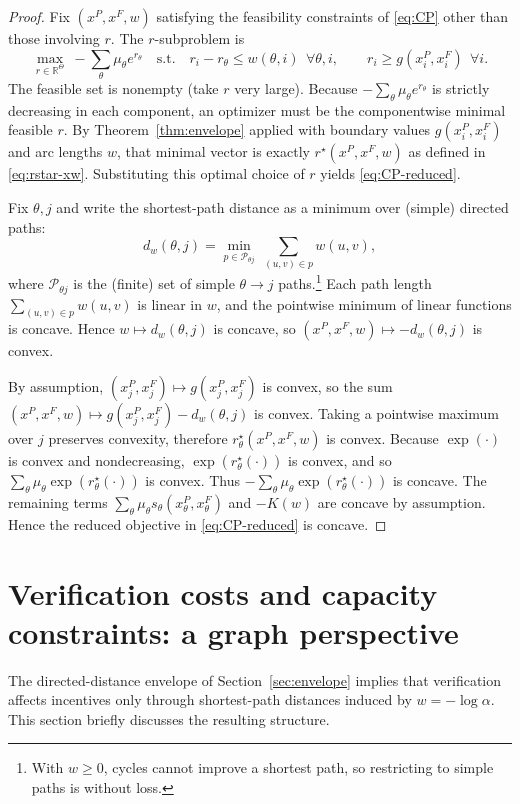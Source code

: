 \documentclass[final,3p,times]{elsarticle}
\theoremstyle{plain}
\theoremstyle{definition}
\newcommand{\R}{\mathbb{R}}
\newcommand{\1}{\mathbbm{1}}
\newcommand{\ThetaSet}{\Theta}
\begin{document}
\begin{proof}
Fix $(x^P,x^F,w)$ satisfying the feasibility constraints of \eqref{eq:CP} other than those involving $r$.
The $r$-subproblem is
\[
\max_{r\in\R^{\ThetaSet}}\ -\sum_{\theta}\mu_\theta e^{r_\theta}
\quad\text{s.t.}\quad
r_i-r_\theta\le w(\theta,i)\ \ \forall \theta,i,\qquad
r_i\ge g(x_i^P,x_i^F)\ \ \forall i.
\]
The feasible set is nonempty (take $r$ very large). Because $-\sum_\theta \mu_\theta e^{r_\theta}$ is strictly decreasing in each component,
an optimizer must be the componentwise minimal feasible $r$.
By Theorem~\ref{thm:envelope} applied with boundary values $g(x_i^P,x_i^F)$ and arc lengths $w$, that minimal vector is exactly $r^\star(x^P,x^F,w)$
as defined in \eqref{eq:rstar-xw}. Substituting this optimal choice of $r$ yields \eqref{eq:CP-reduced}.

Fix $\theta,j$ and write the shortest-path distance as a minimum over (simple) directed paths:
\[
d_w(\theta,j)=\min_{p\in\mathcal{P}_{\theta j}}\ \sum_{(u,v)\in p} w(u,v),
\]
where $\mathcal{P}_{\theta j}$ is the (finite) set of simple $\theta\to j$ paths.\footnote{With $w\ge 0$, cycles cannot improve a shortest path, so restricting to simple paths is without loss.}
Each path length $\sum_{(u,v)\in p} w(u,v)$ is linear in $w$, and the pointwise minimum of linear functions is concave.
Hence $w\mapsto d_w(\theta,j)$ is concave, so $(x^P,x^F,w)\mapsto -d_w(\theta,j)$ is convex.

By assumption, $(x_j^P,x_j^F)\mapsto g(x_j^P,x_j^F)$ is convex, so the sum
$(x^P,x^F,w)\mapsto g(x_j^P,x_j^F)-d_w(\theta,j)$ is convex. Taking a pointwise maximum over $j$ preserves convexity,
therefore $r^\star_\theta(x^P,x^F,w)$ is convex.
Because $\exp(\cdot)$ is convex and nondecreasing, $\exp(r^\star_\theta(\cdot))$ is convex, and so $\sum_\theta \mu_\theta \exp(r^\star_\theta(\cdot))$ is convex.
Thus $-\sum_\theta \mu_\theta \exp(r^\star_\theta(\cdot))$ is concave.
The remaining terms $\sum_\theta \mu_\theta s_\theta(x_\theta^P,x_\theta^F)$ and $-K(w)$ are concave by assumption.
Hence the reduced objective in \eqref{eq:CP-reduced} is concave.
\end{proof}

\section{Verification costs and capacity constraints: a graph perspective}

The directed-distance envelope of Section~\ref{sec:envelope} implies that verification affects incentives only through shortest-path distances induced by $w=-\log \alpha$. This section briefly discusses the resulting structure.
\end{document}
